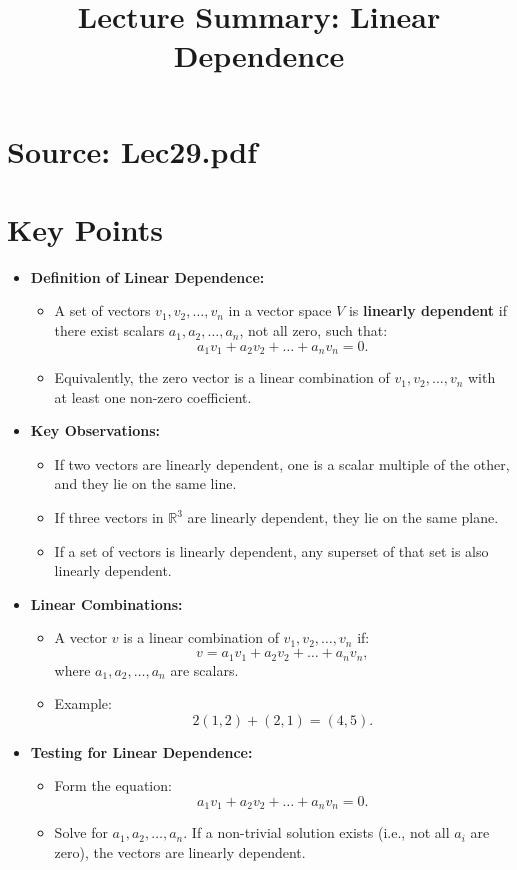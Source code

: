 \documentclass{article}
\title{Lecture Summary: Linear Dependence}
\author{}
\date{}
\begin{document}
\maketitle

\section*{Source: Lec29.pdf}

\section*{Key Points}

\begin{itemize}
  \item \textbf{Definition of Linear Dependence:}
    \begin{itemize}
      \item A set of vectors $v_1, v_2, \dots, v_n$ in a vector space $V$ is \textbf{linearly dependent} if there exist scalars $a_1, a_2, \dots, a_n$, not all zero, such that:
        \[
          a_1 v_1 + a_2 v_2 + \dots + a_n v_n = 0.
        \]
      \item Equivalently, the zero vector is a linear combination of $v_1, v_2, \dots, v_n$ with at least one non-zero coefficient.
    \end{itemize}

  \item \textbf{Key Observations:}
    \begin{itemize}
      \item If two vectors are linearly dependent, one is a scalar multiple of the other, and they lie on the same line.
      \item If three vectors in $\mathbb{R}^3$ are linearly dependent, they lie on the same plane.
      \item If a set of vectors is linearly dependent, any superset of that set is also linearly dependent.
    \end{itemize}

  \item \textbf{Linear Combinations:}
    \begin{itemize}
      \item A vector $v$ is a linear combination of $v_1, v_2, \dots, v_n$ if:
        \[
          v = a_1 v_1 + a_2 v_2 + \dots + a_n v_n,
        \]
        where $a_1, a_2, \dots, a_n$ are scalars.
      \item Example:
        \[
          2(1, 2) + (2, 1) = (4, 5).
        \]
    \end{itemize}

  \item \textbf{Testing for Linear Dependence:}
    \begin{itemize}
      \item Form the equation:
        \[
          a_1 v_1 + a_2 v_2 + \dots + a_n v_n = 0.
        \]
      \item Solve for $a_1, a_2, \dots, a_n$. If a non-trivial solution exists (i.e., not all $a_i$ are zero), the vectors are linearly dependent.
    \end{itemize}
\end{itemize}
\end{document}
